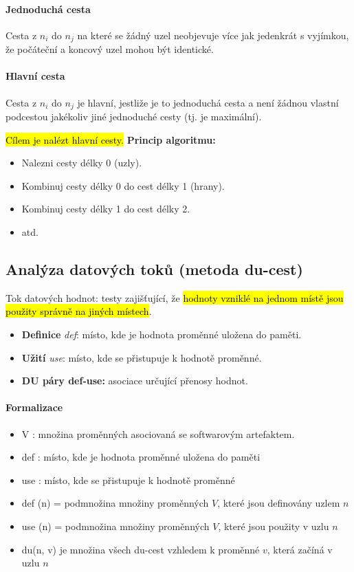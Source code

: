 \paragraph{Jednoduchá cesta} Cesta z $n_i$ do $n_j$ na které se žádný uzel neobjevuje více jak jedenkrát s vyjímkou, že počáteční a koncový uzel mohou být identické.

\paragraph{Hlavní cesta} Cesta z $n_i$ do $n_j$ je hlavní, jestliže je to jednoduchá cesta a není žádnou vlastní podcestou jakékoliv jiné jednoduché cesty (tj. je maximální).

\noindent \hl{Cílem je nalézt hlavní cesty.} \textbf{Princip algoritmu:}

\begin{itemize}[itemsep=0px]
\item Nalezni cesty délky 0 (uzly).
\item Kombinuj cesty délky 0 do cest délky 1 (hrany).
\item Kombinuj cesty délky 1 do cest délky 2.
\item atd.
\end{itemize}

\subsection{Analýza datových toků (metoda du-cest)}
Tok datových hodnot: testy zajišťující, že \hl{hodnoty vzniklé na jednom místě jsou použity správně na jiných místech}. 

\begin{itemize}[itemsep=0px]
\item \textbf{Definice} \textit{def}: místo, kde je hodnota proměnné uložena do paměti. 
\item \textbf{Užití} \textit{use}: místo, kde se přistupuje k hodnotě proměnné.
\item \textbf{DU páry def-use:} asociace určující přenosy hodnot. 
\end{itemize}

\paragraph{Formalizace}
\begin{itemize}[itemsep=0px]
\item V : množina proměnných asociovaná se softwarovým artefaktem. 
\item def : místo, kde je hodnota proměnné uložena do paměti
\item use : místo, kde se přistupuje k hodnotě proměnné
\item def (n) = podmnožina množiny proměnných $V$, které jsou definovány uzlem $n$
\item use (n) = podmnožina množiny proměnných $V$, které jsou použity v uzlu $n$
\item du(n, v) je množina všech du-cest vzhledem k proměnné $v$, která začíná v uzlu $n$
\end{itemize}

